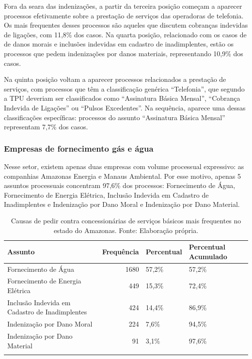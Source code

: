 \documentclass[]{report}
\begin{document}
Fora da seara das indenizações, a partir da terceira posição começam a
aparecer processos efetivamente sobre a prestação de serviços das
operadoras de telefonia. Os mais frequentes desses processos são aqueles
que discutem cobranças indevidas de ligações, com 11,8\% dos casos. Na
quarta posição, relacionado com os casos de de danos morais e inclusões
indevidas em cadastro de inadimplentes, estão os processos que pedem
indenizações por danos materiais, representando 10,9\% dos casos.

Na quinta posição voltam a aparecer processos relacionados a prestação
de serviços, com processos que têm a classificação genérica
``Telefonia'', que segundo a TPU deveriam ser classificados como
``Assinatura Básica Mensal'', ``Cobrança Indevida de Ligações'' ou
``Pulsos Excedentes''. Na sequência, aparece uma dessas classificações
específicas: processos do assunto ``Assinatura Básica Mensal''
representam 7,7\% dos casos.

\subsubsection{Empresas de fornecimento gás e
água}\label{empresas-de-fornecimento-gas-e-agua}

Nesse setor, existem apenas duas empresas com volume processual
expressivo: as companhias Amazonas Energia e Manaus Ambiental. Por esse
motivo, apenas 5 assuntos processuais concentram 97,6\% dos processos:
Fornecimento de Água, Fornecimento de Energia Elétrica, Inclusão
Indevida em Cadastro de Inadimplentes e Indenização por Dano Moral e
Indenização por Dano Material.

\begin{longtable}{lrll}
\caption{Causas de pedir contra concessionárias de serviços básicos mais frequentes no estado do Amazonas. Fonte: Elaboração própria.} \\
  \hline
Assunto & Frequência & Percentual & Percentual Acumulado \\
  \hline
Fornecimento de Água & 1680 & 57,2\% & 57,2\% \\
  Fornecimento de Energia Elétrica & 449 & 15,3\% & 72,4\% \\
  Inclusão Indevida em Cadastro de Inadimplentes & 424 & 14,4\% & 86,9\% \\
  Indenização por Dano Moral & 224 & 7,6\% & 94,5\% \\
  Indenização por Dano Material &  91 & 3,1\% & 97,6\% \\
   \hline
\hline
\label{unnamed-chunk-86}
\end{longtable}
\end{document}
